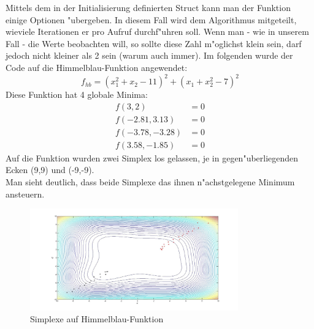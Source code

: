 Mittels dem in der Initialisierung definierten Struct kann man der Funktion einige Optionen "ubergeben. 
In diesem Fall wird dem Algorithmus mitgeteilt, wieviele Iterationen er pro Aufruf durchf"uhren soll. 
Wenn man - wie in unserem Fall - die Werte beobachten will, so sollte diese Zahl m"oglichst klein sein, darf jedoch nicht kleiner als 2 sein (warum auch immer).
Im folgenden wurde der Code auf die Himmelblau-Funktion angewendet: 
\begin{equation}
	f_{hb} = (x_1^2 + x_2 -11)^2 + (x_1+x_2^2-7)^2
\end{equation}
Diese Funktion hat 4 globale Minima: 
\begin{subequations}
	\begin{align}
		f(3,2) &= 0 \\
		f(-2.81,3.13) &= 0\\
		f(-3.78,-3.28) &= 0\\
		f(3.58,-1.85) &= 0
	\end{align}
\end{subequations}
Auf die Funktion wurden zwei Simplex los gelassen, je in gegen"uberliegenden Ecken (9,9) und (-9,-9).\\
Man sieht deutlich, dass beide Simplexe das ihnen n"achstgelegene Minimum ansteuern. 
\begin{figure}[h]
	\centering
	\includegraphics[width=0.8\textwidth]{downhill/HimmelblauHoehen.jpg}%
  	\caption{Simplexe auf Himmelblau-Funktion}%
	\label{fig:HB1}%
\end{figure}


